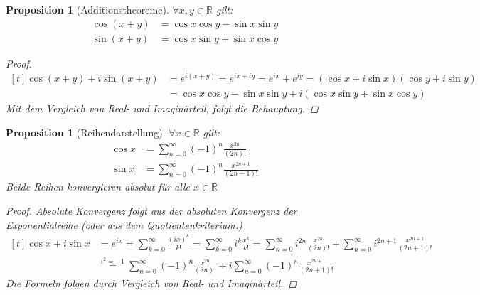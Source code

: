 \documentclass[a4paper,titlepage,oneside]{article}
\def\R{\ensuremath{\mathbb{R}} }
\def\im{\ensuremath{\mathit{i}} }
\def\e{\ensuremath{\mathit{e}} }
\newcommand{\suminf}[2][n]{\ensuremath{\sum_{#1= 0}^{\infty}{#2}}}
\theoremstyle{thmstyle}
\newtheorem{prop}[satz]{Proposition}
\theoremstyle{subthmstyle}
\begin{document}
\begin{prop}[Additionstheoreme]
$\forall x,y \in \R$ gilt:
\begin{align*} \cos (x + y) &= \cos x \cos y - \sin x \sin y\\
\sin (x + y) &= \cos x \sin y + \sin x \cos y \end{align*}
\begin{proof}\begin{math}\begin{aligned}[t]\cos (x + y) + \im \sin (x + y) &= \e^{\im(x+y)} = \e^{\im x + \im y} = \e^{\im x} + \e^{\im y} = (\cos x + \im \sin x) (\cos y + \im \sin y) \\
&= \cos x \cos y - \sin x \sin y + \im(\cos x \sin y + \sin x \cos y) \end{aligned}\end{math} \\Mit dem Vergleich von Real- und Imaginärteil, folgt die Behauptung.
\end{proof}
\end{prop}

\begin{prop}[Reihendarstellung]
$\forall x \in \R $ gilt:
\begin{align*} \cos x &= \suminf{(-1)^n \frac{x^{2n}}{(2n)!}}\\
\sin x &= \suminf{(-1)^n \frac{x^{2n+1}}{(2n+1)!}}\end{align*} 
Beide Reihen konvergieren absolut für alle $ x \in \R$
\begin{proof}
Absolute Konvergenz folgt aus der absoluten Konvergenz der Exponentialreihe (oder aus dem Quotientenkriterium.)\\
$\displaystyle \begin{aligned}[t]\cos x + \im \sin x &= \e^{\im x} = \suminf[k]{\frac{(\im x)^k}{k!}} = \suminf[k]{\im^k\frac{x^k}{k!}} = \suminf{\im^{2n} \frac{x^{2n}}{(2n)!}} + \suminf{\im^{2n+1} \frac{x^{2n+1}}{(2n+1)!}} \\
&\overset{\im^2 = -1}{=} \suminf{(-1)^{n} \frac{x^{2n}}{(2n)!}} + \im \suminf{(-1)^{n} \frac{x^{2n+1}}{(2n+1)!}}\end{aligned}$\\
Die Formeln folgen durch Vergleich von Real- und Imaginärteil.
\end{proof}
\end{prop}
\end{document}
